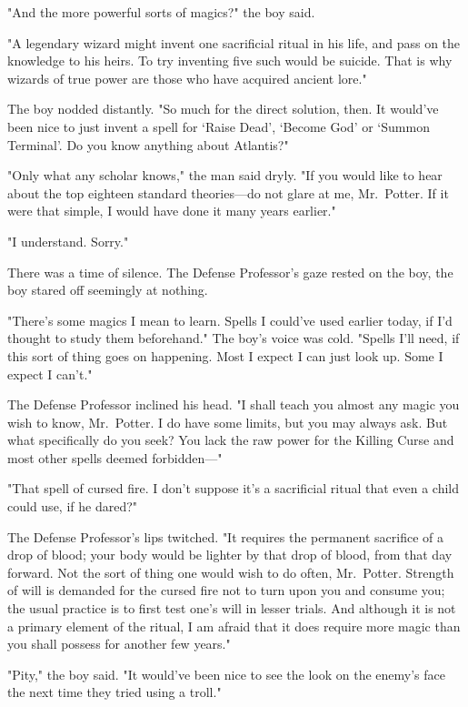 "And the more powerful sorts of magics?" the boy said.

"A legendary wizard might invent one sacrificial ritual in his life, and pass
on the knowledge to his heirs. To try inventing five such would be suicide.
That is why wizards of true power are those who have acquired ancient lore."

The boy nodded distantly. "So much for the direct solution, then. It would've
been nice to just invent a spell for `Raise Dead', `Become God' or `Summon
Terminal'. Do you know anything about Atlantis?"

"Only what any scholar knows," the man said dryly. "If you would like to hear
about the top eighteen standard theories---do not glare at me, Mr.~Potter. If
it were that simple, I would have done it many years earlier."

"I understand. Sorry."

There was a time of silence. The Defense Professor's gaze rested on the boy,
the boy stared off seemingly at nothing.

"There's some magics I mean to learn. Spells I could've used earlier today, if
I'd thought to study them beforehand." The boy's voice was cold. "Spells I'll
need, if this sort of thing goes on happening. Most I expect I can just look
up. Some I expect I can't."

The Defense Professor inclined his head. "I shall teach you almost any magic
you wish to know, Mr.~Potter. I do have some limits, but you may always ask.
But what specifically do you seek? You lack the raw power for the Killing Curse
and most other spells deemed forbidden\mbox{---}"

"That spell of cursed fire. I don't suppose it's a sacrificial ritual that even
a child could use, if he dared?"

The Defense Professor's lips twitched. "It requires the permanent sacrifice of
a drop of blood; your body would be lighter by that drop of blood, from that
day forward. Not the sort of thing one would wish to do often, Mr.~Potter.
Strength of will is demanded for the cursed fire not to turn upon you and
consume you; the usual practice is to first test one's will in lesser trials.
And although it is not a primary element of the ritual, I am afraid that it
does require more magic than you shall possess for another few years."

"Pity," the boy said. "It would've been nice to see the look on the enemy's
face the next time they tried using a troll."

